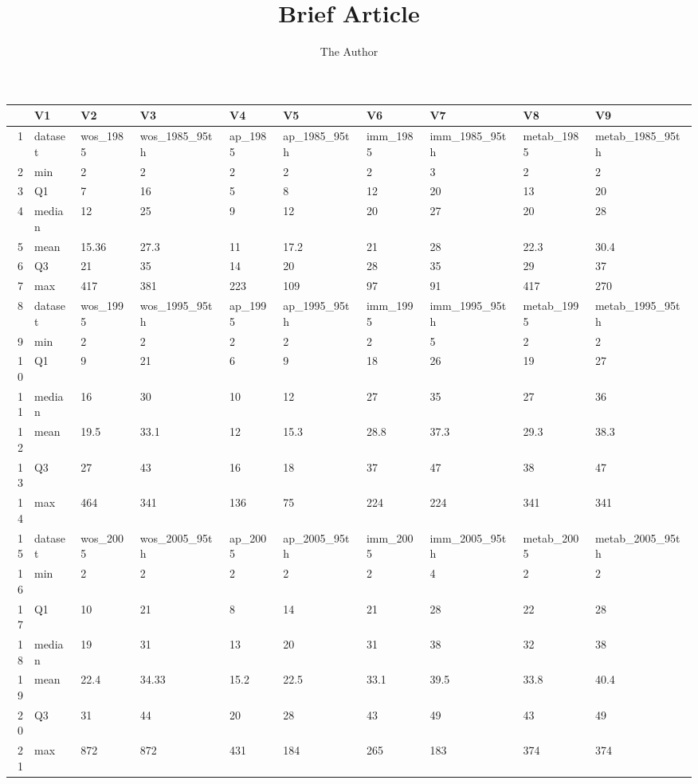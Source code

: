 \documentclass[11pt, oneside]{article}   	%
\title{Brief Article}
\author{The Author}
\begin{document}
\maketitle
\section{}

\begin{table}[ht]
\centering
\begin{tabular}{rlllllllll}
  \hline
 & V1 & V2 & V3 & V4 & V5 & V6 & V7 & V8 & V9 \\ 
  \hline
1 & dataset & wos\_1985 & wos\_1985\_95th & ap\_1985 & ap\_1985\_95th & imm\_1985 & imm\_1985\_95th & metab\_1985 & metab\_1985\_95th \\ 
  2 & min & 2 & 2 & 2 & 2 & 2 & 3 & 2 & 2 \\ 
  3 & Q1 & 7 & 16 & 5 & 8 & 12 & 20 & 13 & 20 \\ 
  4 & median & 12 & 25 & 9 & 12 & 20 & 27 & 20 & 28 \\ 
  5 & mean & 15.36 & 27.3 & 11 & 17.2 & 21 & 28 & 22.3 & 30.4 \\ 
  6 & Q3 & 21 & 35 & 14 & 20 & 28 & 35 & 29 & 37 \\ 
  7 & max & 417 & 381 & 223 & 109 & 97 & 91 & 417 & 270 \\ 
  8 & dataset & wos\_1995 & wos\_1995\_95th & ap\_1995 & ap\_1995\_95th & imm\_1995 & imm\_1995\_95th & metab\_1995 & metab\_1995\_95th \\ 
  9 & min & 2 & 2 & 2 & 2 & 2 & 5 & 2 & 2 \\ 
  10 & Q1 & 9 & 21 & 6 & 9 & 18 & 26 & 19 & 27 \\ 
  11 & median & 16 & 30 & 10 & 12 & 27 & 35 & 27 & 36 \\ 
  12 & mean & 19.5 & 33.1 & 12 & 15.3 & 28.8 & 37.3 & 29.3 & 38.3 \\ 
  13 & Q3 & 27 & 43 & 16 & 18 & 37 & 47 & 38 & 47 \\ 
  14 & max & 464 & 341 & 136 & 75 & 224 & 224 & 341 & 341 \\ 
  15 & dataset & wos\_2005 & wos\_2005\_95th & ap\_2005 & ap\_2005\_95th & imm\_2005 & imm\_2005\_95th & metab\_2005 & metab\_2005\_95th \\ 
  16 & min & 2 & 2 & 2 & 2 & 2 & 4 & 2 & 2 \\ 
  17 & Q1 & 10 & 21 & 8 & 14 & 21 & 28 & 22 & 28 \\ 
  18 & median & 19 & 31 & 13 & 20 & 31 & 38 & 32 & 38 \\ 
  19 & mean & 22.4 & 34.33 & 15.2 & 22.5 & 33.1 & 39.5 & 33.8 & 40.4 \\ 
  20 & Q3 & 31 & 44 & 20 & 28 & 43 & 49 & 43 & 49 \\ 
  21 & max & 872 & 872 & 431 & 184 & 265 & 183 & 374 & 374 \\ 
   \hline
\end{tabular}
\end{table}



\end{document}
